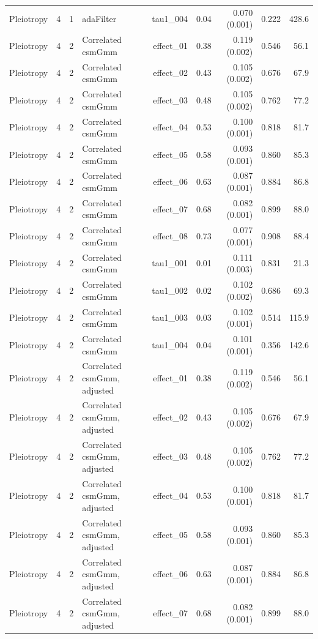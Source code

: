 \begin{longtable}{lcclrrrrr}
Pleiotropy & 4 & 1 & adaFilter & tau1\_004 & 0.04 & 0.070 (0.001) & 0.222 & 428.6\\
Pleiotropy & 4 & 2 & Correlated csmGmm & effect\_01 & 0.38 & 0.119 (0.002) & 0.546 & 56.1\\
Pleiotropy & 4 & 2 & Correlated csmGmm & effect\_02 & 0.43 & 0.105 (0.002) & 0.676 & 67.9\\
Pleiotropy & 4 & 2 & Correlated csmGmm & effect\_03 & 0.48 & 0.105 (0.002) & 0.762 & 77.2\\
Pleiotropy & 4 & 2 & Correlated csmGmm & effect\_04 & 0.53 & 0.100 (0.001) & 0.818 & 81.7\\
Pleiotropy & 4 & 2 & Correlated csmGmm & effect\_05 & 0.58 & 0.093 (0.001) & 0.860 & 85.3\\
Pleiotropy & 4 & 2 & Correlated csmGmm & effect\_06 & 0.63 & 0.087 (0.001) & 0.884 & 86.8\\
Pleiotropy & 4 & 2 & Correlated csmGmm & effect\_07 & 0.68 & 0.082 (0.001) & 0.899 & 88.0\\
Pleiotropy & 4 & 2 & Correlated csmGmm & effect\_08 & 0.73 & 0.077 (0.001) & 0.908 & 88.4\\
Pleiotropy & 4 & 2 & Correlated csmGmm & tau1\_001 & 0.01 & 0.111 (0.003) & 0.831 & 21.3\\
Pleiotropy & 4 & 2 & Correlated csmGmm & tau1\_002 & 0.02 & 0.102 (0.002) & 0.686 & 69.3\\
Pleiotropy & 4 & 2 & Correlated csmGmm & tau1\_003 & 0.03 & 0.102 (0.001) & 0.514 & 115.9\\
Pleiotropy & 4 & 2 & Correlated csmGmm & tau1\_004 & 0.04 & 0.101 (0.001) & 0.356 & 142.6\\
Pleiotropy & 4 & 2 & Correlated csmGmm, adjusted & effect\_01 & 0.38 & 0.119 (0.002) & 0.546 & 56.1\\
Pleiotropy & 4 & 2 & Correlated csmGmm, adjusted & effect\_02 & 0.43 & 0.105 (0.002) & 0.676 & 67.9\\
Pleiotropy & 4 & 2 & Correlated csmGmm, adjusted & effect\_03 & 0.48 & 0.105 (0.002) & 0.762 & 77.2\\
Pleiotropy & 4 & 2 & Correlated csmGmm, adjusted & effect\_04 & 0.53 & 0.100 (0.001) & 0.818 & 81.7\\
Pleiotropy & 4 & 2 & Correlated csmGmm, adjusted & effect\_05 & 0.58 & 0.093 (0.001) & 0.860 & 85.3\\
Pleiotropy & 4 & 2 & Correlated csmGmm, adjusted & effect\_06 & 0.63 & 0.087 (0.001) & 0.884 & 86.8\\
Pleiotropy & 4 & 2 & Correlated csmGmm, adjusted & effect\_07 & 0.68 & 0.082 (0.001) & 0.899 & 88.0\\

\end{longtable}
